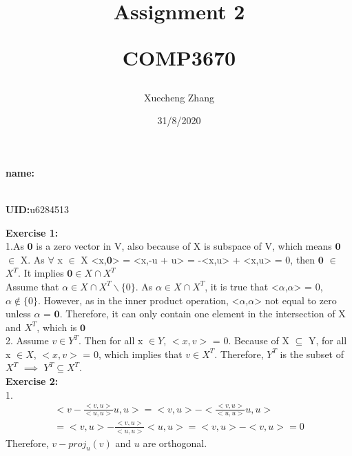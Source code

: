 \documentclass{article}
\title{Assignment  2\\ \vspace{0.2cm}

		COMP3670
}
\begin{document}
\setlength\parindent{0pt}
\maketitle
\vspace*{\fill}
    \begin{center}
    
        \textbf{name:}\author{Xuecheng Zhang}
        \\
        \textbf{UID:}u6284513
        
        \vspace{1.8cm}
        
        \date{31/8/2020}
    
    \end{center}
\vspace*{\fill}

\newpage

\textbf{Exercise 1:}\\
1.As $\textbf{0}$ is a zero vector in V, also because of X is subspace of V, which means $\textbf{0}$ $\in$ X. As $\forall$ x $\in$ X <x,$\textbf{0}$> = <x,-u + u> = -<x,u> + <x,u> = 0, then $\textbf{0}$ $\in$ $X^T$. It implies $\textbf{0} \in X \cap X^T$\\
Assume that $\alpha \in X \cap X^T \backslash \{0\}$. As $\alpha \in X \cap X^T$, it is true that <$\alpha$,$\alpha$> = 0, $\alpha \notin \{0\}$. However, as in the inner product operation, <$\alpha$,$\alpha$> not equal to zero unless $\alpha$ = $\textbf{0}$. Therefore, it can only contain one element in the intersection of X and $X^T$, which is $\textbf{0}$\\

2. Assume $v \in Y^T$. Then for all x $\in Y$, $<x,v>$ = 0. Because of X $\subseteq$ Y, for all x $\in X$, $<x,v>$ = 0, which implies that  $v \in X^T$. Therefore, $Y^T$ is the subset of $X^T$ $\implies$ $Y^T\subseteq X^T$. \\

\textbf{Exercise 2:}\\

1. 
\begin{gather}
<v - \frac{<v,u>}{<u,u>}u,u > = <v,u> - <\frac{<v,u>}{<u,u>}u, u> \\
= <v,u> - \frac{<v,u>}{<u,u>} <u,u>  = <v,u> - <v,u> = 0
\end{gather}
Therefore, $v - proj_u(v)$ and $u$ are orthogonal.\\
\end{document}
